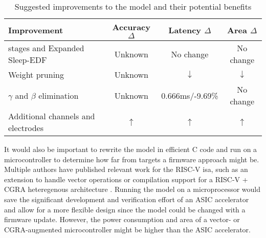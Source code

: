 \begin{table}[ht]
    \centering
    \renewcommand{\arraystretch}{1.2} %
    \setlength{\arrayrulewidth}{1.5pt} %
    \caption{Suggested improvements to the model and their potential benefits}
    \begin{tabular}{@{} p{7cm}ccc @{}}
        \toprule
        Improvement                         & Accuracy $\Delta$ & Latency $\Delta$                  & Area $\Delta$ \\\midrule
        \ac{stages} and Expanded Sleep-EDF  & Unknown           & No change                         & No change     \\
        Weight pruning                      & Unknown           & $\downarrow$                      & $\downarrow$  \\ 
        $\gamma$ and $\beta$ elimination    & Unknown           & 0.666\si{\milli\second}/-9.69\%   & No change     \\
        Additional channels and electrodes  & $\uparrow$        & $\uparrow$                        & $\uparrow$    \\\bottomrule
    \end{tabular}
    \label{tab:model_improvements}
\end{table}

It would also be important to rewrite the model in efficient C code and run on a microcontroller to determine how far from targets a firmware approach might be. Multiple authors have 
published relevant work for the RISC-V \ac{isa}, such as an extension to handle vector operations \cite{perotti2022new} or compilation support for a RISC-V + CGRA heteregenous architecture
\cite{lingRISC-V-CGRA}. Running the model on a microprocessor would save the significant development and verification effort of an ASIC accelerator and allow for a more flexible design since
the model could be changed with a firmware update. However, the power consumption and area of a vector- or CGRA-augmented microcontroller might be higher than the ASIC accelerator.

